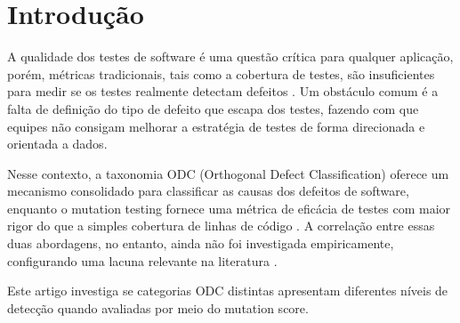\documentclass[
    12pt,
    a4paper,
    sumario=tradicional,
    oneside,
    article
]{abntex2}
\begin{document}
\tableofcontents*
\cleardoublepage

\textual

\section{Introdução}

A qualidade dos testes de software é uma questão crítica para qualquer
aplicação, porém, métricas tradicionais, tais como a cobertura de testes,
são insuficientes para medir se os testes realmente detectam defeitos
\cite{papadakis2018}.
Um obstáculo comum é a falta de definição do tipo de defeito que escapa
dos testes, fazendo com que equipes não consigam melhorar a estratégia
de testes de forma direcionada e orientada a dados.

Nesse contexto, a taxonomia ODC (Orthogonal Defect Classification)
\cite{chillarege1992} oferece um mecanismo consolidado para classificar
as causas dos defeitos de software, enquanto o mutation testing fornece
uma métrica de eficácia de testes com maior rigor do que a simples
cobertura de linhas de código \cite{papadakis2018}.
A correlação entre essas duas abordagens, no entanto, ainda não foi
investigada empiricamente, configurando uma lacuna relevante na
literatura \cite{butcher2002, chillarege1992}.

Este artigo investiga se categorias ODC distintas apresentam diferentes
níveis de detecção quando avaliadas por meio do mutation score.

\postextual


\end{document}
